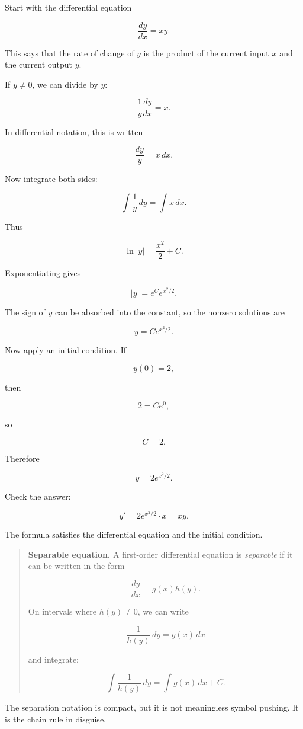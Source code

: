 Start with the differential equation

\[
\frac{dy}{dx}=xy.
\]

This says that the rate of change of \(y\) is the product of the current input \(x\) and
the current output \(y\).

If \(y\neq0\), we can divide by \(y\):

\[
\frac{1}{y}\frac{dy}{dx}=x.
\]

In differential notation, this is written

\[
\frac{dy}{y}=x\,dx.
\]

Now integrate both sides:

\[
\int \frac{1}{y}\,dy=\int x\,dx.
\]

Thus

\[
\ln|y|=\frac{x^2}{2}+C.
\]

Exponentiating gives

\[
|y|=e^C e^{x^2/2}.
\]

The sign of \(y\) can be absorbed into the constant, so the nonzero solutions are

\[
y=Ce^{x^2/2}.
\]

Now apply an initial condition.  If

\[
y(0)=2,
\]

then

\[
2=Ce^0,
\]

so

\[
C=2.
\]

Therefore

\[
\boxed{
y=2e^{x^2/2}.
}
\]

Check the answer:

\[
y'=2e^{x^2/2}\cdot x
=
xy.
\]

The formula satisfies the differential equation and the initial condition.

\begin{quote}
\textbf{Separable equation.}
A first-order differential equation is \emph{separable} if it can be written in the form

\[
\frac{dy}{dx}=g(x)h(y).
\]

On intervals where \(h(y)\neq0\), we can write

\[
\frac{1}{h(y)}\,dy=g(x)\,dx
\]

and integrate:

\[
\boxed{
\int \frac{1}{h(y)}\,dy=\int g(x)\,dx+C.
}
\]
\end{quote}

The separation notation is compact, but it is not meaningless symbol pushing.  It is the
chain rule in disguise.

